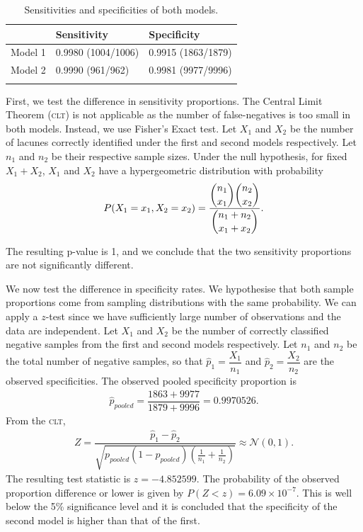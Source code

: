 \begin{table}[ht]
	\centering
	\begin{tabular}{@{}lll@{}}
	\toprule[1.5pt]
	& Sensitivity & Specificity\\
	\midrule
	Model 1 & 0.9980 (1004/1006) & 0.9915 (1863/1879)\\
	Model 2 & 0.9990 (961/962) & 0.9981 (9977/9996)\\
	\bottomrule[1.5pt]\\
	\end{tabular}
	\caption{Sensitivities and specificities of both models.}
	\label{results-sens-spec-tab}
\end{table}

First, we test the difference in sensitivity proportions. The Central Limit Theorem (\textsc{clt}) is not applicable as the number of false-negatives is too small in both models. Instead, we use Fisher's Exact test. Let $X_1$ and $X_2$ be the number of lacunes correctly identified under the first and second models respectively. Let $n_1$ and $n_2$ be their respective sample sizes. Under the null hypothesis, for fixed $X_1 + X_2$, $X_1$ and $X_2$ have a hypergeometric distribution with probability
\begin{align*}
	P(X_1 = x_1, X_2 = x_2) = \dfrac{\dbinom{n_1}{x_1}\dbinom{n_2}{x_2}}{\dbinom{n_1 + n_2}{x_1 + x_2}}.
\end{align*}

The resulting p-value is 1, and we conclude that the two sensitivity proportions are not significantly different.

We now test the difference in specificity rates. We hypothesise that both sample proportions come from sampling distributions with the same probability. We can apply a $z$-test since we have sufficiently large number of observations and the data are independent. Let $X_1$ and $X_2$ be the number of correctly classified negative samples from the first and second models respectively. Let $n_1$ and $n_2$ be the total number of negative samples, so that $\hat{p}_1 = \dfrac{X_1}{n_1}$ and $\hat{p}_2 = \dfrac{X_2}{n_2}$ are the observed specificities. The observed pooled specificity proportion is
\begin{align*}
	\hat p_{pooled} = \dfrac{1863+9977}{1879+9996} = 0.9970526.
\end{align*}
From the \textsc{clt},
\begin{align*}
	Z = \dfrac{\hat{p}_1 - \hat{p}_2}{\sqrt{p_{pooled}(1 - p_{pooled})\left(\frac{1}{n_1} + \frac{1}{n_2}\right)}} \approx \mathcal{N}(0,1).
\end{align*}
The resulting test statistic is $z = -4.852599$. The probability of the observed proportion difference or lower is given by $P(Z < z) = 6.09\times10^{-7}$. This is well below the 5\% significance level and it is concluded that the specificity of the second model is higher than that of the first.

